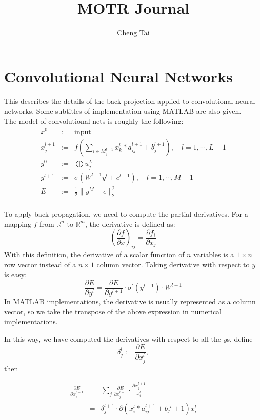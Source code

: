 \documentclass[12pt, reqno]{amsart}
\title{MOTR Journal}
\author{Cheng Tai}
\date{}
\begin{document}
\maketitle
\section*{Convolutional Neural Networks}
This describes the details of the back projection applied to convolutional neural networks. Some subtitles of implementation using MATLAB are also given. \\

The model of convolutional nets is roughly the following:
\begin{eqnarray*}
x^0 &:= & \textrm{input} \\
x^{l+1}_j&:=&f(\sum_{i\in M_{j}^{l+1}} x_k^l * a_{ij}^{l+1} + b^{l+1}_j),\quad l=1,\cdots, L-1 \\
y^0 & := & \bigoplus u_j^L \\
y^{l+1}&:=&\sigma(W^{l+1}y^l + c^{l+1}) ,\quad l=1,\cdots, M-1 \\
E&:=&\frac{1}{2} \|y^M-e\|_2^2  \\
\end{eqnarray*}

To apply back propagation, we need to compute the partial derivatives. For a mapping $f$ from $\mathbb{R}^n$ to $\mathbb{R}^m$, the derivative is defined as:
\[
(\frac{\partial f}{\partial x})_{ij} =\frac{\partial f_i}{\partial x_j}
\]
With this definition, the derivative of a scalar function of $n$ variables is a $1\times n$ row vector instead of a $n\times 1$ column vector. 
Taking derivative with respect to $y$ is easy:
\[
	\frac{\partial E}{\partial y^l} = \frac{\partial E}{\partial y^{l+1}}\cdot \sigma^{'}(y^{l+1}) \cdot W^{l+1}
\]
In MATLAB implementations, the derivative is usually represented as a column vector, so we take the transpose of the above expression in numerical implementations.

In this way, we have computed the derivatives with respect to all the $y$s, define
\[
\delta_j^{l} :=\frac{\partial E}{\partial x_j^{l}},
\]
then

\begin{eqnarray*}
\frac{\partial E}{\partial x_{i}^{l+1}} &=& \sum_{j} \frac{\partial
  E}{\partial x_{j}^{l+1}} \cdot \frac{\partial x_j^{l+1}}{x_{i}^{l}}
\\
&=& \delta_j^{l+1} \cdot \partial {(x_i^{l}*a_{ij}^{l+1}+b_j{^l+1})}{x_i^{l}}\\
\end{eqnarray*}
\end{document}
